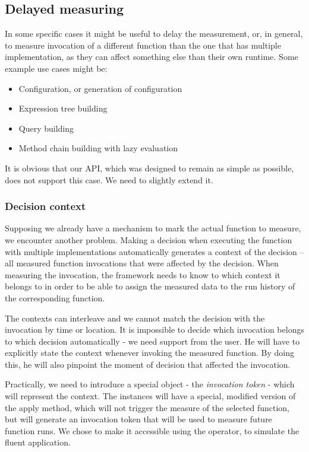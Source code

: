 \subsection{Delayed measuring}
\label{subsec:delayed_measuring}

In some specific cases it might be useful to delay the measurement, or, in general, to measure invocation of a different function than the one that has multiple implementation, as they can affect something else than their own runtime. Some example use cases might be:

\begin{itemize}
	\item Configuration, or generation of configuration
	\item Expression tree building
	\item Query building
	\item Method chain building with lazy evaluation
\end{itemize}

It is obvious that our API, which was designed to remain as simple as possible, does not support this case. We need to slightly extend it.

\subsubsection{Decision context}

Supposing we already have a mechanism to mark the actual function to measure, we encounter another problem. Making a decision when executing the function with multiple implementations automatically generates a context of the decision -- all measured function invocations that were affected by the decision. When measuring the invocation, the framework needs to know to which context it belongs to in order to be able to assign the measured data to the run history of the corresponding function.

The contexts can interleave and we cannot match the decision with the invocation by time or location. It is impossible to decide which invocation belongs to which decision automatically - we need support from the user. He will have to explicitly state the context whenever invoking the measured function. By doing this, he will also pinpoint the moment of decision that affected the invocation.

Practically, we need to introduce a special object - the \textit{invocation token} - which will represent the context. The  instances will have a special, modified version of the apply method, which will not trigger the measure of the selected function, but will generate an invocation token that will be used to measure future function runs. We chose to make it accessible using the \inlinecode{\textasciicircum()} operator, to simulate the fluent application.

